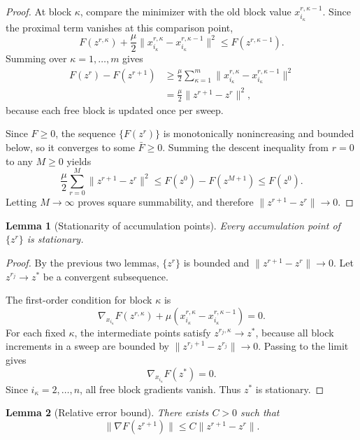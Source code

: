 \documentclass[11pt]{article}
\newtheorem{lemma}{Lemma}
\begin{document}
\begin{proof}
At block \(\kappa\), compare the minimizer with the old block value \(x_{i_\kappa}^{r,\kappa-1}\).  Since the proximal term vanishes at this comparison point,
\[
    F(z^{r,\kappa})
    +
    \frac{\mu}{2}
    \|x_{i_\kappa}^{r,\kappa}-x_{i_\kappa}^{r,\kappa-1}\|^2
    \le
    F(z^{r,\kappa-1}).
\]
Summing over \(\kappa=1,\ldots,m\) gives
\[
\begin{aligned}
    F(z^r)-F(z^{r+1})
    &\ge
    \frac{\mu}{2}
    \sum_{\kappa=1}^m
    \|x_{i_\kappa}^{r,\kappa}-x_{i_\kappa}^{r,\kappa-1}\|^2  \\
    &=
    \frac{\mu}{2}\|z^{r+1}-z^r\|^2,
\end{aligned}
\]
because each free block is updated once per sweep.

Since \(F\ge0\), the sequence \(\{F(z^r)\}\) is monotonically nonincreasing and bounded below, so it converges to some \(\bar F\ge0\).  Summing the descent inequality from \(r=0\) to any \(M\ge0\) yields
\[
    \frac{\mu}{2}
    \sum_{r=0}^{M}
    \|z^{r+1}-z^r\|^2
    \le
    F(z^0)-F(z^{M+1})
    \le
    F(z^0).
\]
Letting \(M\to\infty\) proves square summability, and therefore \(\|z^{r+1}-z^r\|\to0\).
\end{proof}

\begin{lemma}[Stationarity of accumulation points]
Every accumulation point of \(\{z^r\}\) is stationary.
\end{lemma}

\begin{proof}
By the previous two lemmas, \(\{z^r\}\) is bounded and \(\|z^{r+1}-z^r\|\to0\).  Let \(z^{r_j}\to z^*\) be a convergent subsequence.

The first-order condition for block \(\kappa\) is
\[
    \nabla_{x_{i_\kappa}}F(z^{r,\kappa})
    +
    \mu
    \left(x_{i_\kappa}^{r,\kappa}-x_{i_\kappa}^{r,\kappa-1}\right)
    =
    0.
\]
For each fixed \(\kappa\), the intermediate points satisfy \(z^{r_j,\kappa}\to z^*\), because all block increments in a sweep are bounded by \(\|z^{r_j+1}-z^{r_j}\|\to0\).  Passing to the limit gives
\[
    \nabla_{x_{i_\kappa}}F(z^*)=0.
\]
Since \(i_\kappa=2,\ldots,n\), all free block gradients vanish.  Thus \(z^*\) is stationary.
\end{proof}

\begin{lemma}[Relative error bound]
There exists \(C>0\) such that
\[
    \|\nabla F(z^{r+1})\|
    \le
    C\|z^{r+1}-z^r\|.
\]
\end{lemma}
\end{document}
